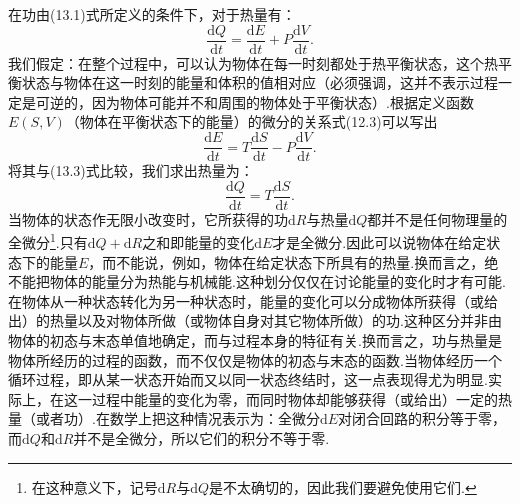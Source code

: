 在功由(13.1)式所定义的条件下，对于热量有：
\begin{equation}
  \frac{\mathrm{d}Q}{\mathrm{d}t}
  =\frac{\mathrm{d}E}{\mathrm{d}t}
  +P\frac{\mathrm{d}V}{\mathrm{d}t}.
\end{equation}
我们假定：在整个过程中，可以认为物体在每一时刻都处于热平衡状态，这个热平衡状态与物体在这一时刻的能量和体积的值相对应（必须强调，这并不表示过程一定是可逆的，因为物体可能并不和周围的物体处于平衡状态）.根据定义函数$E(S,V)$（物体在平衡状态下的能量）的微分的关系式(12.3)可以写出
\begin{equation*}
  \frac{\mathrm{d}E}{\mathrm{d}t}
  =T\frac{\mathrm{d}S}{\mathrm{d}t}
  -P\frac{\mathrm{d}V}{\mathrm{d}t}.
\end{equation*}
将其与(13.3)式比较，我们求出热量为：
\begin{equation}
  \frac{\mathrm{d}Q}{\mathrm{d}t}
  =T\frac{\mathrm{d}S}{\mathrm{d}t}.
\end{equation}
当物体的状态作无限小改变时，它所获得的功$\mathrm{d}R$与热量$\mathrm{d}Q$都并不是任何物理量的全微分\footnote{在这种意义下，记号$\mathrm{d}R$与$\mathrm{d}Q$是不太确切的，因此我们要避免使用它们.}.只有$\mathrm{d}Q+\mathrm{d}R$之和即能量的变化$\mathrm{d}E$才是全微分.因此可以说物体在给定状态下的能量$E$，而不能说，例如，物体在给定状态下所具有的热量.换而言之，绝不能把物体的能量分为热能与机械能.这种划分仅仅在讨论能量的变化时才有可能.在物体从一种状态转化为另一种状态时，能量的变化可以分成物体所获得（或给出）的热量以及对物体所做（或物体自身对其它物体所做）的功.这种区分并非由物体的初态与末态单值地确定，而与过程本身的特征有关.换而言之，功与热量是物体所经历的过程的函数，而不仅仅是物体的初态与末态的函数.当物体经历一个循环过程，即从某一状态开始而又以同一状态终结时，这一点表现得尤为明显.实际上，在这一过程中能量的变化为零，而同时物体却能够获得（或给出）一定的热量（或者功）.在数学上把这种情况表示为：全微分$\mathrm{d}E$对闭合回路的积分等于零，而$\mathrm{d}Q$和$\mathrm{d}R$并不是全微分，所以它们的积分不等于零.

